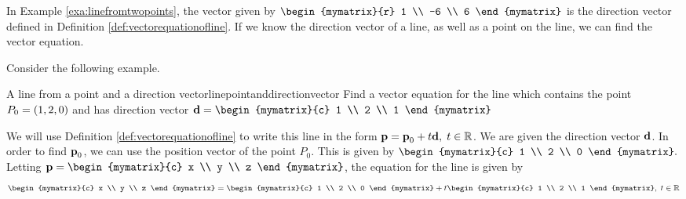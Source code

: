 In Example \ref{exa:linefromtwopoints}, the vector given by 
$\begin{mymatrix}{r}
 1 \\
-6 \\
6 
\end{mymatrix}$
is the direction vector defined in Definition \ref{def:vectorequationofline}.
If we know the direction vector of a line, as well as a point on the line,
we can find the vector equation. 

Consider the following example. 

\begin{example}{A line from a point and a direction vector}{linepointanddirectionvector}
Find a vector equation for the line which contains the point $P_0 = \left(
1,2,0\right) $ and has direction vector $\vect{d} = 
\begin{mymatrix}{c}
1 \\
2 \\
1
\end{mymatrix}
$
\end{example}

\begin{solution}
We will use Definition \ref{def:vectorequationofline} to write this line in the form 
$\mbox{\bf p}=\mbox{\bf p}_0+t\mbox{\bf d},\; t\in \mathbb{R}$. We are given the direction vector $\mbox{\bf d}$. 
In order to find $\mbox{\bf p}_0$, we can use the position vector of the point $P_0$. 
This is given by 
$\begin{mymatrix}{c}
1 \\
2 \\
0
\end{mymatrix}.
$
Letting $\vect{p}
=
\begin{mymatrix}{c}
 x \\
y \\
z
\end{mymatrix}
$,
the equation for the line is given by 
\begin{equation}
\begin{mymatrix}{c}
x \\
y \\
z
\end{mymatrix}
=
\begin{mymatrix}{c}
1 \\
2 \\
0
\end{mymatrix}
+ 
t
\begin{mymatrix}{c}
1 \\
2 \\
1
\end{mymatrix},
\;t\in
\R \label{vectoreqn}
\end{equation}
\end{solution}

